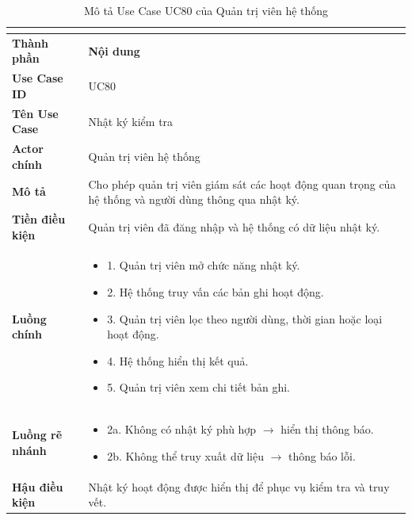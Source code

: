 \begin{longtable}{|C{3cm}|L{11cm}|}
\caption{Mô tả Use Case UC80 của Quản trị viên hệ thống}\\
\label{tab:mo-ta-uc80-quan-tri-vien}\\
\hline
\textbf{Thành phần} & \textbf{Nội dung} \\
\hline
\textbf{Use Case ID} & UC80 \\
\hline
\textbf{Tên Use Case} & Nhật ký kiểm tra \\
\hline
\textbf{Actor chính} & Quản trị viên hệ thống \\
\hline
\textbf{Mô tả} &
Cho phép quản trị viên giám sát các hoạt động quan trọng của hệ thống và người dùng thông qua nhật ký.
\\
\hline
\textbf{Tiền điều kiện} &
Quản trị viên đã đăng nhập và hệ thống có dữ liệu nhật ký.
\\
\hline
\textbf{Luồng chính} &
\begin{itemize}[leftmargin=*,topsep=2pt,itemsep=2pt]
    \item 1. Quản trị viên mở chức năng nhật ký.
    \item 2. Hệ thống truy vấn các bản ghi hoạt động.
    \item 3. Quản trị viên lọc theo người dùng, thời gian hoặc loại hoạt động.
    \item 4. Hệ thống hiển thị kết quả.
    \item 5. Quản trị viên xem chi tiết bản ghi.
\end{itemize}
\\
\hline
\textbf{Luồng rẽ nhánh} &
\begin{itemize}[leftmargin=*,topsep=2pt,itemsep=2pt]
    \item 2a. Không có nhật ký phù hợp $\rightarrow$ hiển thị thông báo.
    \item 2b. Không thể truy xuất dữ liệu $\rightarrow$ thông báo lỗi.
\end{itemize}
\\
\hline
\textbf{Hậu điều kiện} &
Nhật ký hoạt động được hiển thị để phục vụ kiểm tra và truy vết.
\\
\hline
\end{longtable}


